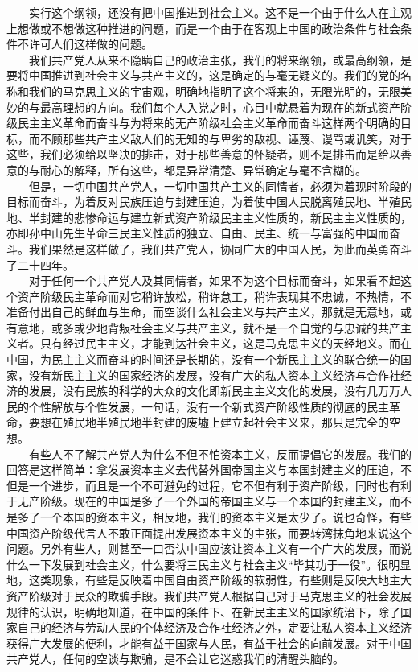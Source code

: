 \documentclass[cn,11pt,chinese]{elegantbook}
\begin{document}
　　实行这个纲领，还没有把中国推进到社会主义。这不是一个由于什么人在主观上想做或不想做这种推进的问题，而是一个由于在客观上中国的政治条件与社会条件不许可人们这样做的问题。\\
　　我们共产党人从来不隐瞒自己的政治主张，我们的将来纲领，或最高纲领，是要将中国推进到社会主义与共产主义的，这是确定的与毫无疑义的。我们的党的名称和我们的马克思主义的宇宙观，明确地指明了这个将来的，无限光明的，无限美妙的与最高理想的方向。我们每个人入党之时，心目中就悬着为现在的新式资产阶级民主主义革命而奋斗与为将来的无产阶级社会主义革命而奋斗这样两个明确的目标，而不顾那些共产主义敌人们的无知的与卑劣的敌视、诬蔑、谩骂或讥笑，对于这些，我们必须给以坚决的排击，对于那些善意的怀疑者，则不是排击而是给以善意的与耐心的解释，所有这些，都是异常清楚、异常确定与毫不含糊的。\\
　　但是，一切中国共产党人，一切中国共产主义的同情者，必须为着现时阶段的目标而奋斗，为着反对民族压迫与封建压迫，为着使中国人民脱离殖民地、半殖民地、半封建的悲惨命运与建立新式资产阶级民主主义性质的，新民主主义性质的，亦即孙中山先生革命三民主义性质的独立、自由、民主、统一与富强的中国而奋斗。我们果然是这样做了，我们共产党人，协同广大的中国人民，为此而英勇奋斗了二十四年。\\
　　对于任何一个共产党人及其同情者，如果不为这个目标而奋斗，如果看不起这个资产阶级民主革命而对它稍许放松，稍许怠工，稍许表现其不忠诚，不热情，不准备付出自己的鲜血与生命，而空谈什么社会主义与共产主义，那就是无意地，或有意地，或多或少地背叛社会主义与共产主义，就不是一个自觉的与忠诚的共产主义者。只有经过民主主义，才能到达社会主义，这是马克思主义的天经地义。而在中国，为民主主义而奋斗的时间还是长期的，没有一个新民主主义的联合统一的国家，没有新民主主义的国家经济的发展，没有广大的私人资本主义经济与合作社经济的发展，没有民族的科学的大众的文化即新民主主义文化的发展，没有几万万人民的个性解放与个性发展，一句话，没有一个新式资产阶级性质的彻底的民主革命，要想在殖民地半殖民地半封建的废墟上建立起社会主义来，那只是完全的空想。\\
　　有些人不了解共产党人为什么不但不怕资本主义，反而提倡它的发展。我们的回答是这样简单：拿发展资本主义去代替外国帝国主义与本国封建主义的压迫，不但是一个进步，而且是一个不可避免的过程，它不但有利于资产阶级，同时也有利于无产阶级。现在的中国是多了一个外国的帝国主义与一个本国的封建主义，而不是多了一个本国的资本主义，相反地，我们的资本主义是太少了。说也奇怪，有些中国资产阶级代言人不敢正面提出发展资本主义的主张，而要转湾抹角地来说这个问题。另外有些人，则甚至一口否认中国应该让资本主义有一个广大的发展，而说什么一下发展到社会主义，什么要将三民主义与社会主义“毕其功于一役”。很明显地，这类现象，有些是反映着中国自由资产阶级的软弱性，有些则是反映大地主大资产阶级对于民众的欺骗手段。我们共产党人根据自己对于马克思主义的社会发展规律的认识，明确地知道，在中国的条件下、在新民主主义的国家统治下，除了国家自己的经济与劳动人民的个体经济及合作社经济之外，定要让私人资本主义经济获得广大发展的便利，才能有益于国家与人民，有益于社会的向前发展。对于中国共产党人，任何的空谈与欺骗，是不会让它迷惑我们的清醒头脑的。\\
\end{document}
